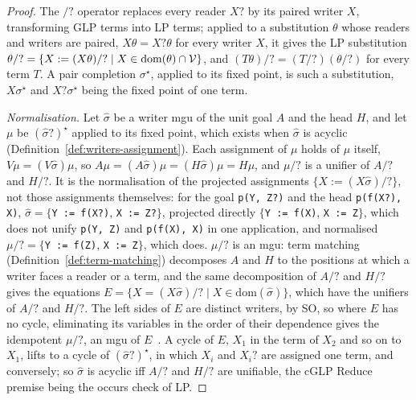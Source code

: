 \begin{proof}
The $/\!?$ operator replaces every reader $X?$ by its paired writer $X$, transforming GLP terms into LP terms; applied to a substitution $\theta$ whose readers and writers are paired, $X\theta = X?\theta$ for every writer $X$, it gives the LP substitution $\theta/? = \{X := (X\theta)/? \mid X \in \mathrm{dom}(\theta)\cap\mathcal{V}\}$, and $(T\theta)/? = (T/?)(\theta/?)$ for every term $T$. A pair completion $\sigma^\star$, applied to its fixed point, is such a substitution, $X\sigma^\star$ and $X?\sigma^\star$ being the fixed point of one term.

\emph{Normalisation.} Let $\hat\sigma$ be a writer mgu of the unit goal $A$ and the head $H$, and let $\mu$ be $(\hat\sigma?)^\star$ applied to its fixed point, which exists when $\hat\sigma$ is acyclic (Definition~\ref{def:writers-assignment}). Each assignment of $\mu$ holds of $\mu$ itself, $V\mu = (V\hat\sigma)\mu$, so $A\mu = (A\hat\sigma)\mu = (H\hat\sigma)\mu = H\mu$, and $\mu/?$ is a unifier of $A/?$ and $H/?$. It is the normalisation of the projected assignments $\{X := (X\hat\sigma)/?\}$, not those assignments themselves: for the goal \verb|p(Y, Z?)| and the head \verb|p(f(X?), X)|, $\hat\sigma = \{$\verb|Y := f(X?)|, \verb|X := Z?|$\}$, projected directly $\{$\verb|Y := f(X)|, \verb|X := Z|$\}$, which does not unify \verb|p(Y, Z)| and \verb|p(f(X), X)| in one application, and normalised $\mu/? = \{$\verb|Y := f(Z)|, \verb|X := Z|$\}$, which does. $\mu/?$ is an mgu: term matching (Definition~\ref{def:term-matching}) decomposes $A$ and $H$ to the positions at which a writer faces a reader or a term, and the same decomposition of $A/?$ and $H/?$ gives the equations $E = \{X = (X\hat\sigma)/? \mid X \in \mathrm{dom}(\hat\sigma)\}$, which have the unifiers of $A/?$ and $H/?$. The left sides of $E$ are distinct writers, by SO, so where $E$ has no cycle, eliminating its variables in the order of their dependence gives the idempotent $\mu/?$, an mgu of $E$~\cite{lloyd1987foundations}. A cycle of $E$, $X_1$ in the term of $X_2$ and so on to $X_1$, lifts to a cycle of $(\hat\sigma?)^\star$, in which $X_i$ and $X_i?$ are assigned one term, and conversely; so $\hat\sigma$ is acyclic iff $A/?$ and $H/?$ are unifiable, the cGLP Reduce premise being the occurs check of LP.


\end{proof}
